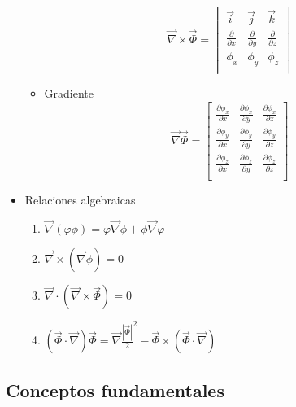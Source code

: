 \begin{itemize}
\begin{itemize}
		\[
		\vec\nabla \times \vec\Phi = \begin{vmatrix}
			\vec i & \vec j & \vec k \\
			\frac{\partial}{\partial x} & \frac{\partial}{\partial y} & \frac{\partial}{\partial z} \\
			\phi_x & \phi_y & \phi_z \\
		\end{vmatrix}
		\]
		\item Gradiente 
		\setlength{\arraycolsep}{1.5pt}
		\renewcommand{\arraystretch}{1.5}
		\[\vec\nabla  \vec\Phi = \begin{bmatrix}
			\frac{\partial \phi_x}{\partial x} & \frac{\partial \phi_x}{\partial y} & \frac{\partial \phi_x}{\partial z} \\
			\frac{\partial \phi_y}{\partial x} & \frac{\partial \phi_y}{\partial y} & \frac{\partial \phi_y}{\partial z} \\
			\frac{\partial \phi_z}{\partial x} & \frac{\partial \phi_z}{\partial y} & \frac{\partial \phi_z}{\partial z} \\
		\end{bmatrix}\]
		
	\end{itemize}
	\item Relaciones algebraicas
	\begin{enumerate}
		\item $\vec{\nabla}(\varphi \phi) =\varphi\vec{\nabla}\phi+\phi\vec{\nabla}\varphi$
		\item $\vec{\nabla} \times \left(\vec{\nabla} \phi\right)=0$
		\item $\vec{\nabla} \cdot \left(\vec{\nabla} \times \vec{\Phi}\right) =0$
		\item $\left(\vec{\Phi}  \cdot \vec{\nabla}\right)\vec{\Phi}=\vec{\nabla} \frac{\left|\vec\Phi \right|}{2}^2-\vec\Phi \times \left(\vec{\Phi}  \cdot \vec{\nabla}\right) $ 
	\end{enumerate}
\end{itemize}

\subsection{Conceptos fundamentales}

